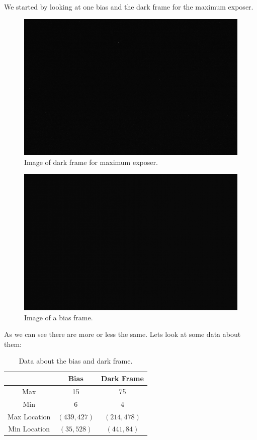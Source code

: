\documentclass{emulateapj}
\begin{document}
We started by looking at one bias and the dark frame for the maximum exposer.

\begin{figure}[H]
\centering
\includegraphics[scale=0.2]{df_max_exp.png}
\caption{Image of dark frame for maximum exposer.}
\label{img:df_max}
\end{figure}

\begin{figure}[H]
\centering
\includegraphics[scale=0.2]{bf1.png}
\caption{Image of a bias frame.}
\label{img:bf1}
\end{figure}

As we can see there are more or less the same. Lets look at some data about them:

\begin{table}[H]
\centering
\begin{tabular}{c|c|c}
 & Bias & Dark Frame \\
 \hline
 Max & 15 & 75 \\
 Min &6 & 4\\
 Max Location & $(439, 427)$ & $(214, 478)$\\
 Min Location & $(35, 528)$ & $(441, 84)$
\end{tabular}
\caption{Data about the bias and dark frame.}
\label{tab:biasDark}
\end{table}
\end{document}
